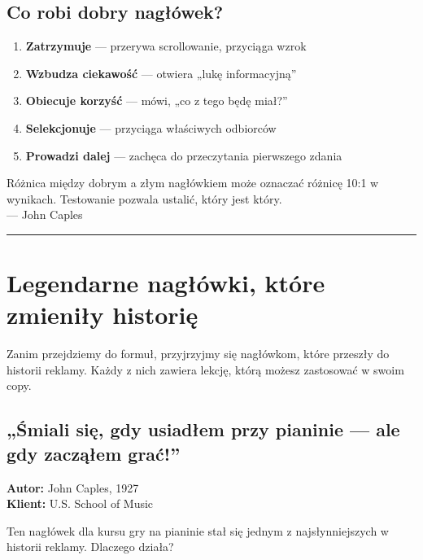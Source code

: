 \documentclass[
  12pt,
  a4paper,
  twoside,
  openright,
  12pt,
  DIV=12,
  BCOR=12mm]{scrbook}
\providecommand{\tightlist}{%
  \setlength{\itemsep}{0pt}\setlength{\parskip}{0pt}}\usepackage{longtable,booktabs,array}
\newcommand{\decoline}{%
  \begin{center}
    \textcolor{bordergray}{\rule{0.3\textwidth}{0.5pt}}
  \end{center}
}
\begin{document}
\subsection{Co robi dobry
nagłówek?}\label{co-robi-dobry-nagux142uxf3wek}

\begin{enumerate}
\def\labelenumi{\arabic{enumi}.}
\tightlist
\item
  \textbf{Zatrzymuje} --- przerywa scrollowanie, przyciąga wzrok
\item
  \textbf{Wzbudza ciekawość} --- otwiera „lukę informacyjną''
\item
  \textbf{Obiecuje korzyść} --- mówi, „co z tego będę miał?''
\item
  \textbf{Selekcjonuje} --- przyciąga właściwych odbiorców
\item
  \textbf{Prowadzi dalej} --- zachęca do przeczytania pierwszego zdania
\end{enumerate}

\begin{cytat}
Różnica między dobrym a złym nagłówkiem może oznaczać różnicę 10:1 w wynikach. Testowanie pozwala ustalić, który jest który.\\
--- John Caples
\end{cytat}

\decoline

\section{Legendarne nagłówki, które zmieniły
historię}\label{legendarne-nagux142uxf3wki-ktuxf3re-zmieniux142y-historiux119}

Zanim przejdziemy do formuł, przyjrzyjmy się nagłówkom, które przeszły
do historii reklamy. Każdy z nich zawiera lekcję, którą możesz
zastosować w swoim copy.

\subsection{„Śmiali się, gdy usiadłem przy pianinie --- ale gdy zacząłem
grać!''}\label{ux15bmiali-siux119-gdy-usiadux142em-przy-pianinie-ale-gdy-zaczux105ux142em-graux107}

\textbf{Autor:} John Caples, 1927\\
\textbf{Klient:} U.S. School of Music

Ten nagłówek dla kursu gry na pianinie stał się jednym z
najsłynniejszych w historii reklamy. Dlaczego działa?
\end{document}
